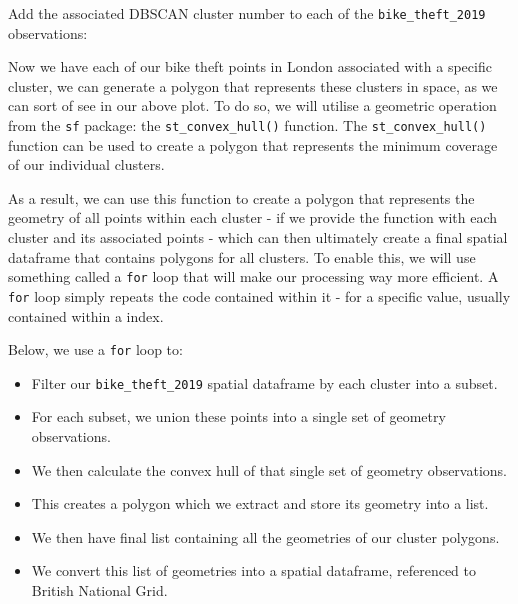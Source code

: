 \documentclass[
]{book}
\newenvironment{Shaded}{\begin{snugshade}}{\end{snugshade}}
\newcommand{\AttributeTok}[1]{\textcolor[rgb]{0.77,0.63,0.00}{#1}}
\newcommand{\CommentTok}[1]{\textcolor[rgb]{0.56,0.35,0.01}{\textit{#1}}}
\newcommand{\FunctionTok}[1]{\textcolor[rgb]{0.00,0.00,0.00}{#1}}
\newcommand{\NormalTok}[1]{#1}
\newcommand{\OtherTok}[1]{\textcolor[rgb]{0.56,0.35,0.01}{#1}}
\newcommand{\SpecialCharTok}[1]{\textcolor[rgb]{0.00,0.00,0.00}{#1}}
\providecommand{\tightlist}{%
  \setlength{\itemsep}{0pt}\setlength{\parskip}{0pt}}
\begin{document}
Add the associated DBSCAN cluster number to each of the \texttt{bike\_theft\_2019} observations:

\begin{Shaded}
\end{Shaded}

Now we have each of our bike theft points in London associated with a specific cluster, we can generate a polygon that represents these clusters in space, as we can sort of see in our above plot. To do so, we will utilise a geometric operation from the \texttt{sf} package: the \texttt{st\_convex\_hull()} function. The \texttt{st\_convex\_hull()} function can be used to create a polygon that represents the minimum coverage of our individual clusters.

As a result, we can use this function to create a polygon that represents the geometry of all points within each cluster - if we provide the function with each cluster and its associated points - which can then ultimately create a final spatial dataframe that contains polygons for all clusters. To enable this, we will use something called a \texttt{for} loop that will make our processing way more efficient. A \texttt{for} loop simply repeats the code contained within it - for a specific value, usually contained within a index.

Below, we use a \texttt{for} loop to:

\begin{itemize}
\tightlist
\item
  Filter our \texttt{bike\_theft\_2019} spatial dataframe by each cluster into a subset.
\item
  For each subset, we union these points into a single set of geometry observations.
\item
  We then calculate the convex hull of that single set of geometry observations.
\item
  This creates a polygon which we extract and store its geometry into a list.
\item
  We then have final list containing all the geometries of our cluster polygons.
\item
  We convert this list of geometries into a spatial dataframe, referenced to British National Grid.
\end{itemize}
\end{document}
